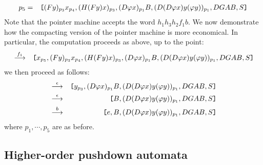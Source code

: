 \begin{example}
\begin{eqnarray}
\nonumber p_5 & = & \hbox{\tt [} (Fy)_{p_3} x_{p_4},(H(Fy)x)_{p_3},(D \varphi x)_{p_1} B,(D(D\varphi x) y (\varphi y))_{p_1}, DGAB, S \hbox{\tt ]}
\end{eqnarray}
Note that the pointer machine accepts the word $h_1h_3h_2f_1b$. We
now demonstrate how the compacting version of the pointer machine
is more economical. In particular, the computation proceeds as
above, up to the point:
\begin{eqnarray}
\nonumber & \stackrel{{f_1}}{\longrightarrow} & \hbox{\tt [} x_{p_5},(Fy)_{p_3}
x_{p_4},(H(Fy)x)_{p_3},(D \varphi x)_{p_1} B,(D(D\varphi x) y
(\varphi y))_{p_1}, DGAB, S \hbox{\tt ]}
\end{eqnarray}
we then proceed as follows:
\begin{eqnarray}
\nonumber & \stackrel{{\epsilon}}{\longrightarrow} & \hbox{\tt [} y_{p_3},(D \varphi x)_{p_1} B,(D(D\varphi x) y (\varphi y))_{p_1}, DGAB, S \hbox{\tt ]} \\
\nonumber & \stackrel{{\epsilon}}{\longrightarrow} & \hbox{\tt [} B,(D(D\varphi x) y (\varphi y))_{p_1}, DGAB, S \hbox{\tt ]} \\
\nonumber & \stackrel{{b}}{\longrightarrow} & \hbox{\tt [} e, B, (D(D\varphi x) y (\varphi
y))_{p_1}, DGAB, S \hbox{\tt ]}
\end{eqnarray}
where $p_1, \cdots, p_5$ are as before.
\end{example}

\subsection{Higher-order pushdown automata}

